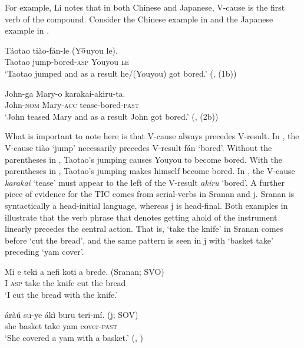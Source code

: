 \documentclass[output=paper]{LSP/langsci}
\begin{document}
For example, Li notes that in both Chinese and Japanese, V-cause is the first verb of the compound. Consider the Chinese example in  and the Japanese example in .

 \begin{exe}
 \ex \label{ex:rosen:33}
 \gll Táotao tiào-fán-le (Y$\overline{\rm{o}}$uyou le).\\
 Taotao jump-bored-\textsc{asp} Youyou \textsc{le}\\
 \glt `Taotao jumped and as a result he/(Youyou) got bored.' (\citealt[480]{Li1993}, (1b))
 
 \ex \label{ex:rosen:34}
\gll John-ga Mary-o karakai-akiru-ta.\\
 John-\textsc{nom} Mary-\textsc{acc} tease-bored-\textsc{past}\\
 \glt `John teased Mary and as a result John got bored.'  (\citealt[481]{Li1993}, (2b))
 
 \end{exe}

What is important to note here is that V-cause always precedes V-result. In , the V-cause ti\`ao `jump' necessarily precedes V-result f\'an `bored'. Without the parentheses in , Taotao's jumping causes Youyou to become bored. With the parentheses in , Taotao's jumping makes himself become bored. In , the V-cause \textit{karakai} `tease' must appear to the left of the V-result \textit{akiru} `bored'. A further piece of evidence for the TIC comes from serial-verbs in Sranan and j. Sranan is syntactically a head-initial language, whereas j is head-final. Both examples in  illustrate that the verb phrase that denotes getting ahold of the instrument linearly precedes the central action. That is, `take the knife' in Sranan comes before `cut the bread', and the same pattern is seen in j with `basket take' preceding `yam cover'.

\begin{exe}
\ex\label{ex:rosen:35}
\begin{xlist}

\ex \gll Mi e teki a nefi koti a brede. \hspace{2cm} (Sranan; SVO)\\
I \textsc{asp} take the knife cut the bread \\
\glt `I cut the bread with the knife.'

\ex
 \gll áràú su-ye ákì buru teri-mí. \hspace{2.6cm} (j; SOV)\\
she basket take yam cover-\textsc{past}\\
\glt `She covered a yam with a basket.' (\citealt[500]{Li1993}, )

\end{xlist}
\end{exe}
\end{document}

